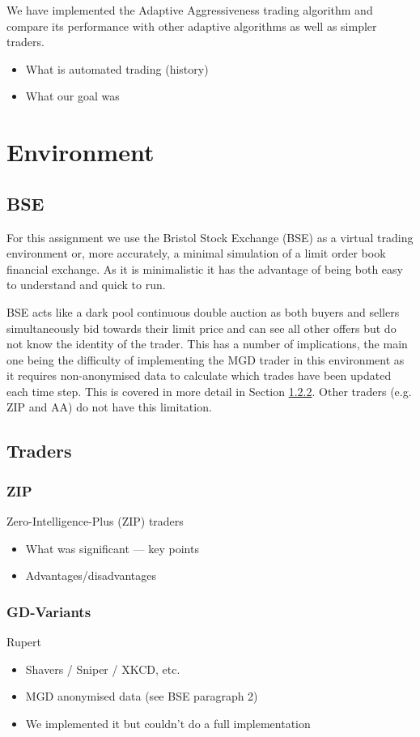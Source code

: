 \documentclass{acm_proc_article-sp}
\begin{document}
We have implemented the Adaptive Aggressiveness trading algorithm and compare
its performance with other adaptive algorithms as well as simpler traders.

\begin{itemize}
	\item What is automated trading (history)
	\item What our goal was
\end{itemize}


\section{Environment} \label{sec:environment}
\subsection{BSE} \label{sec:BSE}
For this assignment we use the Bristol Stock Exchange (BSE) as a virtual trading environment or, 
more accurately, a minimal simulation of a limit order book financial exchange. As it is 
minimalistic it has the advantage of being both easy to understand and quick to run.

BSE acts like a dark pool continuous double auction as both buyers and sellers simultaneously bid 
towards their limit price and can see all other offers but do not know the identity of the trader. 
This has a number of implications, the main one being the difficulty of implementing the MGD trader 
in this environment as it requires non-anonymised data to calculate which trades have been updated 
each time step. This is covered in more detail in Section \ref{sec:traders_GDV}. Other traders (e.g. 
ZIP and AA) do not have this limitation.\\


\subsection{Traders} \label{sec:traders}
\subsubsection{ZIP} \label{sec:traders_ZIP}
Zero-Intelligence-Plus (ZIP) traders
\begin{itemize} \itemsep0pt
	\item What was significant --- key points
	\item Advantages/disadvantages
\end{itemize}

\subsubsection{GD-Variants} \label{sec:traders_GDV}
Rupert
\begin{itemize} \itemsep0pt
	\item Shavers / Sniper / XKCD, etc.
	\item MGD anonymised data (see BSE paragraph 2)
	\item We implemented it but couldn't do a full implementation
\end{itemize}
\end{document}
